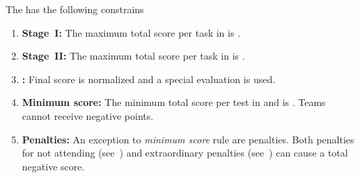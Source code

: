 The  has the following constrains
\begin{enumerate}
	\item \textbf{Stage~I:} The maximum total score per task in  is .
	
	\item \textbf{Stage~II:} The maximum total score per task in  is .

	\item \textbf{:} Final score is normalized and a special evaluation is used.

	\item \textbf{Minimum score:} The minimum total score per test in  and  is .
	Teams cannot receive negative points.

	\item \textbf{Penalties:} An exception to \emph{minimum score} rule are penalties.
	Both penalties for not attending (see~) and extraordinary penalties (see~) can cause a total negative score.
\end{enumerate}




